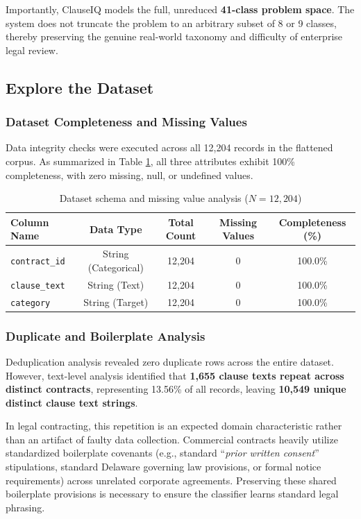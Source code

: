 Importantly, ClauseIQ models the full, unreduced \textbf{41-class problem space}. The system does not truncate the problem to an arbitrary subset of 8 or 9 classes, thereby preserving the genuine real-world taxonomy and difficulty of enterprise legal review.

\subsection{Explore the Dataset}
\label{subsec:explore_dataset}

\subsubsection*{Dataset Completeness and Missing Values}
Data integrity checks were executed across all 12,204 records in the flattened corpus. As summarized in Table \ref{tab:dataset_schema}, all three attributes exhibit 100\% completeness, with zero missing, null, or undefined values.

\begin{table}[h!]
\centering
\small
\begin{tabular}{lcccc}
\toprule
\textbf{Column Name} & \textbf{Data Type} & \textbf{Total Count} & \textbf{Missing Values} & \textbf{Completeness (\%)} \\
\midrule
\texttt{contract\_id} & String (Categorical) & 12,204 & 0 & 100.0\% \\
\texttt{clause\_text} & String (Text)        & 12,204 & 0 & 100.0\% \\
\texttt{category}    & String (Target)      & 12,204 & 0 & 100.0\% \\
\bottomrule
\end{tabular}
\caption{Dataset schema and missing value analysis ($N = 12,204$)}
\label{tab:dataset_schema}
\end{table}

\subsubsection*{Duplicate and Boilerplate Analysis}
Deduplication analysis revealed zero duplicate rows across the entire dataset. However, text-level analysis identified that \textbf{1,655 clause texts repeat across distinct contracts}, representing 13.56\% of all records, leaving \textbf{10,549 unique distinct clause text strings}. 

In legal contracting, this repetition is an expected domain characteristic rather than an artifact of faulty data collection. Commercial contracts heavily utilize standardized boilerplate covenants (e.g., standard ``\textit{prior written consent}'' stipulations, standard Delaware governing law provisions, or formal notice requirements) across unrelated corporate agreements. Preserving these shared boilerplate provisions is necessary to ensure the classifier learns standard legal phrasing.

